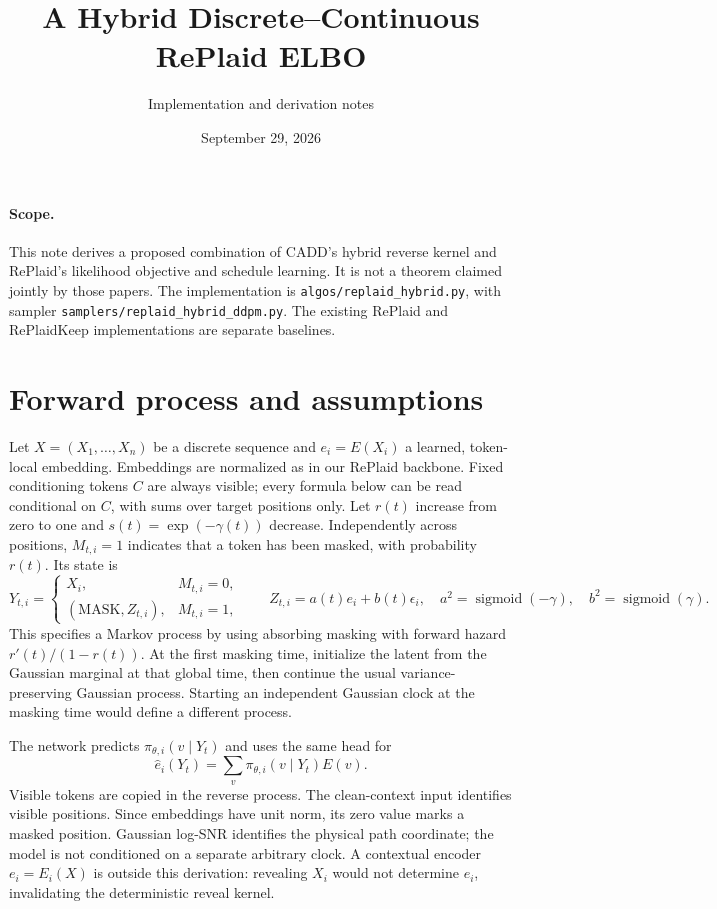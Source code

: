 \documentclass[11pt]{article}
\title{A Hybrid Discrete--Continuous RePlaid ELBO}
\author{Implementation and derivation notes}
\date{September 29, 2026}
\begin{document}
\maketitle

\paragraph{Scope.} This note derives a proposed combination of CADD's hybrid
reverse kernel and RePlaid's likelihood objective and schedule learning.
It is not a theorem claimed jointly by those papers. The implementation is
\texttt{algos/replaid\_hybrid.py}, with sampler
\texttt{samplers/replaid\_hybrid\_ddpm.py}. The existing RePlaid and
RePlaidKeep implementations are separate baselines.

\section{Forward process and assumptions}
Let $X=(X_1,\ldots,X_n)$ be a discrete sequence and $e_i=E(X_i)$ a
learned, token-local embedding. Embeddings are normalized as in our RePlaid
backbone. Fixed conditioning tokens $C$ are always visible; every formula
below can be read conditional on $C$, with sums over target positions only.
Let $r(t)$ increase from zero to one and $s(t)=\exp(-\gamma(t))$ decrease.
Independently across positions, $M_{t,i}=1$ indicates that a token has been
masked, with probability $r(t)$. Its state is
\[
 Y_{t,i}=\begin{cases}
 X_i,&M_{t,i}=0,\\
 (\mathrm{MASK},Z_{t,i}),&M_{t,i}=1,
 \end{cases}\qquad
 Z_{t,i}=a(t)e_i+b(t)\epsilon_i,
 \quad a^2=\operatorname{sigmoid}(-\gamma),\quad
 b^2=\operatorname{sigmoid}(\gamma).
\]
This specifies a Markov process by using absorbing masking with forward
hazard $r'(t)/(1-r(t))$. At the first masking time, initialize the latent
from the Gaussian marginal at that global time, then continue the usual
variance-preserving Gaussian process. Starting an independent Gaussian
clock at the masking time would define a different process.

The network predicts $\pi_{\theta,i}(v\mid Y_t)$ and uses the same head for
\[
 \widehat e_i(Y_t)=\sum_v\pi_{\theta,i}(v\mid Y_t)E(v).
\]
Visible tokens are copied in the reverse process. The clean-context input
identifies visible positions. Since embeddings have unit norm, its zero
value marks a masked position. Gaussian log-SNR identifies the physical
path coordinate; the model is not conditioned on a separate arbitrary clock.
A contextual encoder $e_i=E_i(X)$ is outside this derivation: revealing
$X_i$ would not determine $e_i$, invalidating the deterministic reveal kernel.
\end{document}
